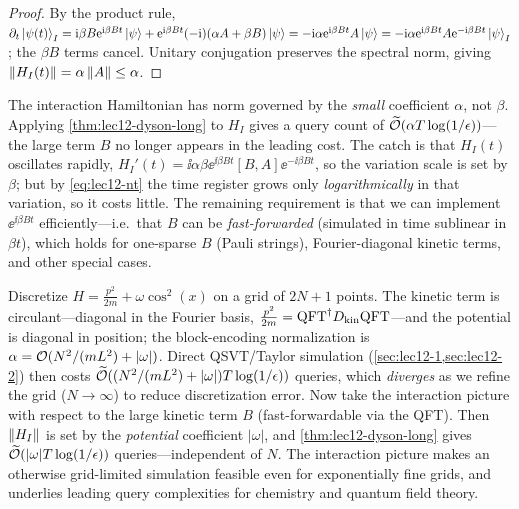 \begin{proof}
By the product rule,
$\partial_t\ket{\psi(t)}_I=\mathrm{i}\beta B\mathrm{e}^{\mathrm{i}\beta Bt}\ket\psi
+\mathrm{e}^{\mathrm{i}\beta Bt}(-\mathrm{i})(\alpha A+\beta B)\ket\psi
=-\mathrm{i}\alpha\mathrm{e}^{\mathrm{i}\beta Bt}A\ket\psi
=-\mathrm{i}\alpha\mathrm{e}^{\mathrm{i}\beta Bt}A\mathrm{e}^{-\mathrm{i}\beta Bt}\ket{\psi}_I$; the $\beta B$ terms cancel.
Unitary conjugation preserves the spectral norm, giving
$\left\lVert H_I(t) \right\rVert=\alpha\left\lVert A \right\rVert\le\alpha$.
\end{proof}

The interaction Hamiltonian has norm governed by the \emph{small} coefficient $\alpha$, not
$\beta$. Applying \cref{thm:lec12-dyson-long} to $H_I$ gives a query count of
$\widetilde{\mathcal{O}}(\alpha T\log(1/\epsilon))$---the large term $B$ no longer appears in the
leading cost. The catch is that $H_I(t)$ oscillates rapidly, $H_I'(t)=\ii\alpha\beta
\ee^{\ii\beta Bt}[B,A]\ee^{-\ii\beta Bt}$, so the variation scale is set by $\beta$; but by
\eqref{eq:lec12-nt} the time register grows only \emph{logarithmically} in that variation,
so it costs little. The remaining requirement is that we can implement $\ee^{\ii\beta Bt}$
efficiently---i.e.\ that $B$ can be \emph{fast-forwarded} (simulated in time sublinear in
$\beta t$), which holds for one-sparse $B$ (Pauli strings), Fourier-diagonal kinetic terms,
and other special cases.

\begin{example}
\label{exa:lec12-particle}
Discretize $H=\tfrac{p^2}{2m}+\omega\cos^2(x)$ on a grid of $2N+1$ points. The kinetic term
is circulant---diagonal in the Fourier basis, $\tfrac{p^2}{2m}=\mathrm{QFT}^{\dagger}
D_{\mathrm{kin}}\mathrm{QFT}$---and the potential is diagonal in position; the block-encoding
normalization is $\alpha=\mathcal{O}(N^2/(mL^2)+|\omega|)$. Direct QSVT/Taylor simulation
(\cref{sec:lec12-1,sec:lec12-2}) then costs
$\widetilde{\mathcal{O}}((N^2/(mL^2)+|\omega|)T\log(1/\epsilon))$ queries, which \emph{diverges}
as we refine the grid ($N\to\infty$) to reduce discretization error. Now take the
interaction picture with respect to the large kinetic term $B$ (fast-forwardable via the
QFT). Then $\left\lVert H_I \right\rVert$ is set by the \emph{potential} coefficient $|\omega|$, and
\cref{thm:lec12-dyson-long} gives $\widetilde{\mathcal{O}}(|\omega|T\log(1/\epsilon))$
queries---independent of $N$. The interaction picture makes an otherwise grid-limited
simulation feasible even for exponentially fine grids, and underlies leading query
complexities for chemistry and quantum field theory.
\end{example}

